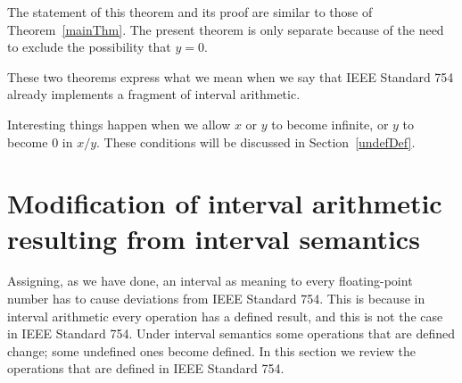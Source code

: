\documentclass[11pt]{article}
\begin{document}
The statement of this theorem and its proof are similar to those of
Theorem~\ref{mainThm}. The present theorem is only separate because of
the need to exclude the possibility that $y = 0$.

These two theorems express what we mean when we say that IEEE Standard
754 already implements a fragment of interval arithmetic.

Interesting things happen when we allow $x$ or $y$ to become infinite,
or $y$ to become $0$ in $x/y$. These conditions will be discussed in
Section~\ref{undefDef}.

\section{Modification of interval arithmetic resulting from interval
  semantics}\label{mods}

Assigning, as we have done, an interval as meaning to every floating-point
number has to cause deviations from IEEE Standard 754.
This is because in interval arithmetic every operation has a defined
result, and this is not the case in IEEE Standard 754.
Under interval semantics some operations that are defined change;
some undefined ones become defined.
In this section we review the operations that are defined in IEEE
Standard 754.
\end{document}
